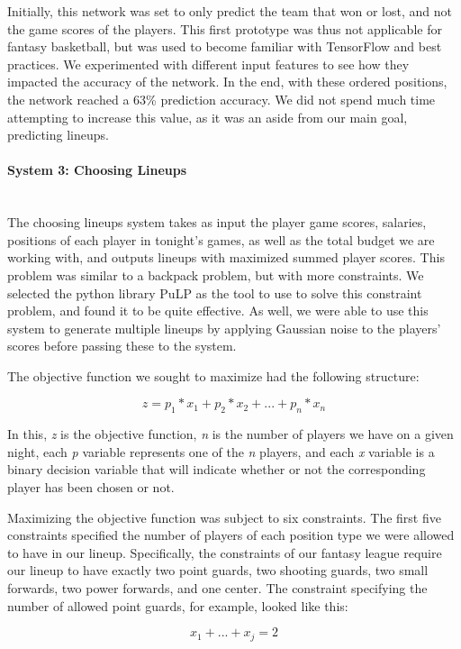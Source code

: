 Initially, this network was set to only predict the team that won or lost, and not the game scores of the players. This first prototype was thus not applicable for fantasy basketball, but was used to become familiar with TensorFlow and best practices. We experimented with different input features to see how they impacted the accuracy of the network. In the end, with these ordered positions, the network reached a 63\% prediction accuracy. We did not spend much time attempting to increase this value, as it was an aside from our main goal, predicting lineups.


\paragraph{System 3: Choosing Lineups}\mbox{}\\
The choosing lineups system takes as input the player game scores, salaries, positions of each player in tonight's games, as well as the total budget we are working with, and outputs lineups with maximized summed player scores. This problem was similar to a backpack problem, but with more constraints. We selected the python library PuLP as the tool to use to solve this constraint problem, and found it to be quite effective. As well, we were able to use this system to generate multiple lineups by applying Gaussian noise to the players' scores before passing these to the system.

The objective function we sought to maximize had the following structure:

\[ z = p_1*x_1 + p_2*x_2 + ... + p_n*x_n \]

In this, \textit{z} is the objective function, \textit{n} is the number of players we have on a given night, each \textit{p} variable represents one of the \textit{n} players, and each \textit{x} variable is a binary decision variable that will indicate whether or not the corresponding player has been chosen or not.

Maximizing the objective function was subject to six constraints. The first five constraints specified the number of players of each position type we were allowed to have in our lineup. Specifically, the constraints of our fantasy league require our lineup to have exactly two point guards, two shooting guards, two small forwards, two power forwards, and one center. The constraint specifying the number of allowed point guards, for example, looked like this:

\[ x_1 + ... + x_j = 2 \]

